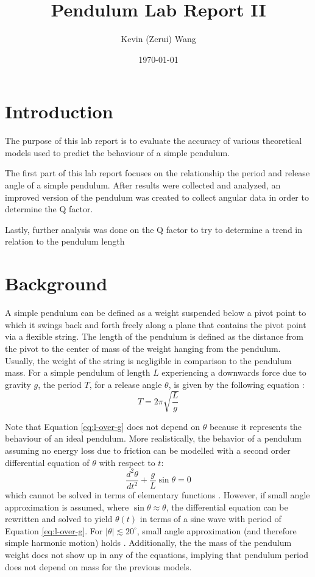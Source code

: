 \documentclass[12pt]{article}
\title{Pendulum Lab Report II}
\author{Kevin (Zerui) Wang}
\date{\today}
\begin{document}

\maketitle
\newpage


\section{Introduction}
{\color{blue}The purpose of this lab report is to evaluate the accuracy of various theoretical models used to predict the behaviour of a simple pendulum.}

The first part of this lab report focuses on the relationship the period and release angle of a simple pendulum. After results were collected and analyzed, an improved version of the pendulum was created to collect angular data in order to determine the Q factor.

{\color{blue}Lastly, further analysis was done on the Q factor to try to determine a trend in relation to the pendulum length}

\section{Background} \label{Background}
{\color{blue}A simple pendulum can be defined as a weight suspended below a pivot point to which it swings back and forth freely along a plane that contains the pivot point via a flexible string. The length of the pendulum is defined as the distance from the pivot to the center of mass of the weight hanging from the pendulum. Usually, the weight of the string is negligible in comparison to the pendulum mass.} For a simple pendulum of length $L$ experiencing a downwards force due to gravity $g$, the period $T$, for a release angle $\theta$, is given by the following equation \cite{the-simple-pendulum}:
\begin{equation} \label{eq:l-over-g}
    T = 2\pi \sqrt{\frac{L}{g}}
\end{equation}

{\color{blue}Note that Equation \ref{eq:l-over-g} does not depend on $\theta$ because it represents the behaviour of an ideal pendulum.} More realistically, the behavior of a pendulum assuming no energy loss due to friction can be modelled with a second order differential equation of $\theta$ with respect to $t$:
\begin{equation} \label{eq:diffeq-pendulum}
    \frac{d^2\theta}{dt^2} + \frac{g}{L}\sin{\theta} = 0
\end{equation}
{\color{blue}which cannot be solved in terms of elementary functions \cite{no-elementary-fns}. However, if small angle approximation is assumed, where $\sin\theta \approx \theta$, the differential equation can be rewritten and solved to yield $\theta(t)$ in terms of a sine wave with period of Equation \ref{eq:l-over-g}. For $|\theta| \lesssim 20^{\circ}$, small angle approximation (and therefore simple harmonic motion) holds \cite{the-simple-pendulum}.} Additionally, the the mass of the pendulum weight does not show up in any of the equations, implying that pendulum period does not depend on mass for the previous models.
\end{document}
